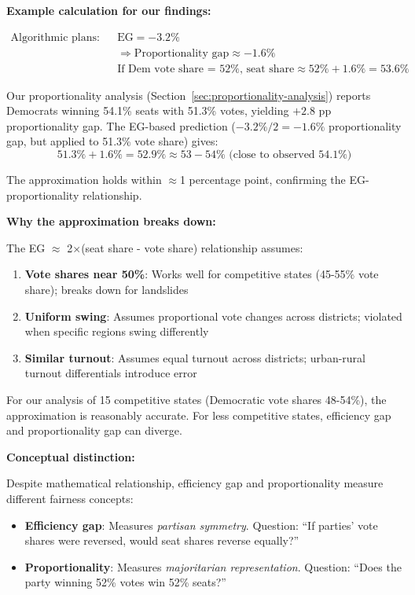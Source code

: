 \textbf{Example calculation for our findings:}

\begin{align*}
\text{Algorithmic plans:} \quad & \text{EG} = -3.2\% \\
& \Rightarrow \text{Proportionality gap} \approx -1.6\% \\
& \text{If Dem vote share = 52\%, seat share} \approx 52\% + 1.6\% = 53.6\%
\end{align*}

Our proportionality analysis (Section~\ref{sec:proportionality-analysis}) reports Democrats winning 54.1\% seats with 51.3\% votes, yielding $+2.8$ pp proportionality gap. The EG-based prediction ($-3.2\% / 2 = -1.6\%$ proportionality gap, but applied to 51.3\% vote share) gives:
\begin{equation}
51.3\% + 1.6\% = 52.9\% \approx 53-54\% \text{ (close to observed 54.1\%)}
\end{equation}

The approximation holds within $\approx$1 percentage point, confirming the EG-proportionality relationship.

\textbf{Why the approximation breaks down:}

The EG $\approx$ 2$\times$(seat share - vote share) relationship assumes:
\begin{enumerate}
    \item \textbf{Vote shares near 50\%}: Works well for competitive states (45-55\% vote share); breaks down for landslides
    \item \textbf{Uniform swing}: Assumes proportional vote changes across districts; violated when specific regions swing differently
    \item \textbf{Similar turnout}: Assumes equal turnout across districts; urban-rural turnout differentials introduce error
\end{enumerate}

For our analysis of 15 competitive states (Democratic vote shares 48-54\%), the approximation is reasonably accurate. For less competitive states, efficiency gap and proportionality gap can diverge.

\textbf{Conceptual distinction:}

Despite mathematical relationship, efficiency gap and proportionality measure different fairness concepts:

\begin{itemize}
    \item \textbf{Efficiency gap}: Measures \emph{partisan symmetry}. Question: ``If parties' vote shares were reversed, would seat shares reverse equally?''
    \item \textbf{Proportionality}: Measures \emph{majoritarian representation}. Question: ``Does the party winning 52\% votes win 52\% seats?''
\end{itemize}

